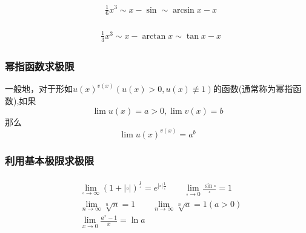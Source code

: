 \documentclass[12pt, a4paper, oneside, UTF8]{ctexbook}  %
\begin{document}
\begin{align*} \boxed
    {
        \begin{aligned}
             & \frac{1}{6} x^3 \sim x-\sin \sim \arcsin x -x
        \end{aligned}
    }
\end{align*}

\begin{align*} \boxed
    {
        \begin{aligned}
             & \frac{1}{3} x^3 \sim x-\arctan x \sim \tan x-x
        \end{aligned}
    }
\end{align*}
\subsubsection{幂指函数求极限}
\begin{defn}{}{}
    一般地，对于形如$u\left(x\right)^{v\left(x\right)}\left(u\left(x\right)>0,u\left(x\right)\not\equiv1\right)$的函数(通常称为幂指函数),如果
    $$
        \lim u\left(x\right)=a{>}0,\lim v\left(x\right)=b
    $$
    那么
    $$
        \lim u(x)^{v(x)}=a^{b}
    $$
\end{defn}
\subsubsection{利用基本极限求极限}

\begin{align*} \boxed
    {
        \begin{aligned}
             & \lim_{\square \to \infty }(1+|\square|)^{\frac{1}{\square}}=e^{|\square| \frac{1}{\square}} \qquad     \lim _ { \square \rightarrow 0 } \frac { \sin \square } { \square } = 1 \\
             & \lim_{n \to \infty }\sqrt[n]{n}=1 \qquad \lim_{n \to \infty} \sqrt[n]{a}=1(a>0)                                                                                                \\
             & \lim_{x \to 0} \frac{a^x-1}{x}=\ln a
        \end{aligned}
    }
\end{align*}
\end{document}
